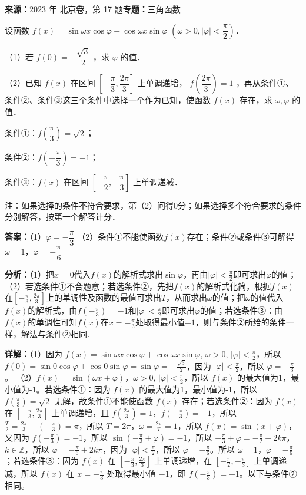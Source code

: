 \begin{question}[points=13]
\textbf{来源：}2023 年 北京卷，第 17 题\quad \textbf{专题：}三角函数\par
设函数 $f(x) = \sin\omega x\cos\varphi + \cos\omega x\sin\varphi$ $\left(\omega>0, |\varphi|<\dfrac{\pi}{2}\right)$．

（1）若 $f(0) = -\dfrac{\sqrt{3}}{2}$ ，求 $\varphi$ 的值．

（2）已知 $f(x)$ 在区间 $\left[-\dfrac{\pi}{3}, \dfrac{2\pi}{3}\right]$ 上单调递增， $f\left(\dfrac{2\pi}{3}\right)=1$ ，再从条件①、条件②、条件③这三个条件中选择一个作为已知，使函数 $f(x)$ 存在，求 $\omega, \varphi$ 的值．

条件①：$f\left(\dfrac{\pi}{3}\right)=\sqrt{2}$；

条件②：$f\left(-\dfrac{\pi}{3}\right)=-1$；

条件③：$f(x)$ 在区间 $\left[-\dfrac{\pi}{2}, -\dfrac{\pi}{3}\right]$ 上单调递减．

注：如果选择的条件不符合要求，第（2）问得0分；如果选择多个符合要求的条件分别解答，按第一个解答计分．
\begin{solution}
\textbf{答案：}（1）$\varphi=-\dfrac{\pi}{3}$ （2）条件①不能使函数$f(x)$存在；条件②或条件③可解得$\omega=1$，$\varphi=-\dfrac{\pi}{6}$

\textbf{分析：}（1）把$x=0$代入$f(x)$的解析式求出$\sin\varphi$，再由$|\varphi|<\frac{\pi}{2}$即可求出$\varphi$的值；（2）若选条件①不合题意；若选条件②，先把$f(x)$的解析式化简，根据$f(x)$在$[-\frac{\pi}{3},\frac{2\pi}{3}]$上的单调性及函数的最值可求出$T$，从而求出$\omega$的值；把$\omega$的值代入$f(x)$的解析式，由$f(-\frac{\pi}{3})=-1$和$|\varphi|<\frac{\pi}{2}$即可求出$\varphi$的值；若选条件③：由$f(x)$的单调性可知$f(x)$在$x=-\frac{\pi}{3}$处取得最小值$-1$，则与条件②所给的条件一样，解法与条件②相同.

\textbf{详解：}（1）因为 $f(x)=\sin\omega x\cos\varphi+\cos\omega x\sin\varphi$, $\omega>0$, $|\varphi|<\frac{\pi}{2}$，所以 $f(0)=\sin0\cos\varphi+\cos0\sin\varphi=\sin\varphi=-\frac{\sqrt{3}}{2}$，因为 $|\varphi|<\frac{\pi}{2}$，所以 $\varphi=-\frac{\pi}{3}$。
（2）$f(x)=\sin(\omega x+\varphi)$，$\omega>0$, $|\varphi|<\frac{\pi}{2}$，所以 $f(x)$ 的最大值为1，最小值为-1。若选条件①：因为 $f(x)$ 的最大值为1，最小值为-1，所以 $f(\frac{\pi}{3})=\sqrt{2}$ 无解，故条件①不能使函数 $f(x)$ 存在；若选条件②：因为 $f(x)$ 在 $[-\frac{\pi}{3},\frac{2\pi}{3}]$ 上单调递增，且 $f(\frac{2\pi}{3})=1$，$f(-\frac{\pi}{3})=-1$，所以 $\frac{T}{2}=\frac{2\pi}{3}-(-\frac{\pi}{3})=\pi$，所以 $T=2\pi$，$\omega=\frac{2\pi}{T}=1$，所以 $f(x)=\sin(x+\varphi)$，又因为 $f(-\frac{\pi}{3})=-1$，所以 $\sin(-\frac{\pi}{3}+\varphi)=-1$，所以 $-\frac{\pi}{3}+\varphi=-\frac{\pi}{2}+2k\pi$，$k\in\mathbb{Z}$，所以 $\varphi=-\frac{\pi}{6}+2k\pi$，因为 $|\varphi|<\frac{\pi}{2}$，所以 $\varphi=-\frac{\pi}{6}$。所以 $\omega=1$，$\varphi=-\frac{\pi}{6}$；若选条件③：因为 $f(x)$ 在 $[-\frac{\pi}{3},\frac{2\pi}{3}]$ 上单调递增，在 $[-\frac{\pi}{2},-\frac{\pi}{3}]$ 上单调递减，所以 $f(x)$ 在 $x=-\frac{\pi}{3}$ 处取得最小值 $-1$，即 $f(-\frac{\pi}{3})=-1$。以下与条件②相同。
\end{solution}
\end{question}

